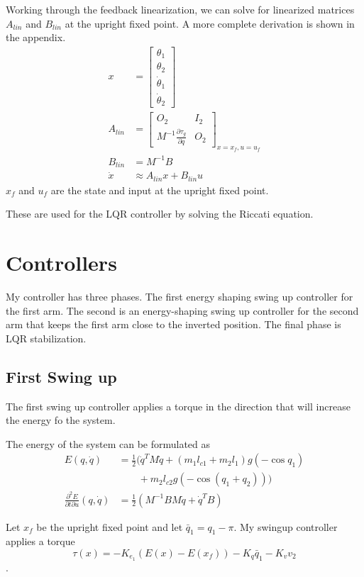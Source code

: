 \documentclass[conference]{IEEEtran}
\begin{document}
Working through the feedback linearization, we can solve for linearized matrices $A_{lin}$ and $B_{lin}$ at the upright fixed point. A more complete derivation is shown in the appendix.
\begin{align}
	x &= \begin{bmatrix}
		\theta_1 \\ \theta_2 \\ \dot \theta_1 \\ \dot \theta_2
	\end{bmatrix} \\
	A_{lin} &= \begin{bmatrix}
		O_2 & I_2 \\
		M^{-1}\frac{\partial\tau_g}{\partial q} & O_2
	\end{bmatrix}_{x=x_f,u=u_f} \\
	B_{lin} &= M^{-1}B \\
	\dot x &\approx A_{lin}x + B_{lin}u
\end{align}
$x_f$ and $u_f$ are the state and input at the upright fixed point.

These are used for the LQR controller by solving the Riccati equation.

\section{Controllers}
My controller has three phases. The first energy shaping swing up controller for the first arm. The second is an energy-shaping swing up controller for the second arm that keeps the first arm close to the inverted position. The final phase is LQR stabilization.

\subsection{First Swing up}
The first swing up controller applies a torque in the direction that will increase the energy fo the system.

The energy of the system can be formulated as
\begin{align}
	E(q,\dot q) &= \frac12 (\dot q^TM\dot q + (m_1l_{c1}+m_2l_1)g(-\cos q_1) \\
	&\qquad + m_2l_{c2}g(-\cos(q_1+q_2))) \\
	\frac{\partial^2 E}{\partial t\partial u}(q,\dot q) &= \frac12 (M^{-1}BM\dot q + \dot q^TB)
\end{align}

Let $x_f$ be the upright fixed point and let $\bar q_1=q_1-\pi$. My swingup controller applies a torque
\begin{equation}
	\tau(x) = -K_{e_1} (E(x) - E(x_f)) - K_q \bar q_1 - K_v v_2
\end{equation}
.
\end{document}
